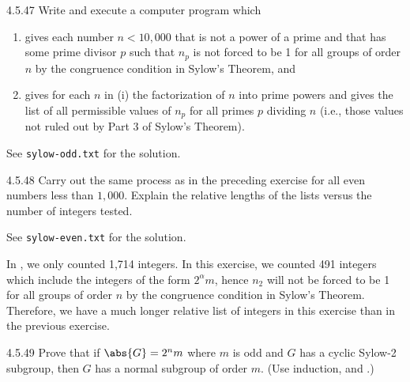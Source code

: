 \begin{exercise}{4.5.47}
	Write and execute a computer program which
	\begin{enumerate}
		\item[(i)] gives each number $n < 10,000$ that is not a power of a prime and that has some prime divisor $p$ such that $n_p$ is not forced to be 1 for all groups of order $n$ by the congruence condition in Sylow's Theorem, and
		\item[(ii)] gives for each $n$ in (i) the factorization of $n$ into prime powers and gives the list of all permissible values of $n_p$ for all primes $p$ dividing $n$ (i.e., those values not ruled out by Part 3 of Sylow's Theorem).
	\end{enumerate}
\end{exercise}

\begin{sol}
	See \verb|sylow-odd.txt| for the solution.
\end{sol}

\begin{exercise}{4.5.48}
	Carry out the same process as in the preceding exercise for all even numbers less than $1,000$.
	Explain the relative lengths of the lists versus the number of integers tested.
\end{exercise}

\begin{sol}
	See \verb|sylow-even.txt| for the solution.

	In , we only counted 1,714 integers.
	In this exercise, we counted 491 integers which include the integers of the form $2^\alpha m$, hence $n_2$ will not be forced to be 1 for all groups of order $n$ by the congruence condition in Sylow's Theorem.
	Therefore, we have a much longer relative list of integers in this exercise than in the previous exercise.
\end{sol}

\begin{exercise}{4.5.49}
	Prove that if $\abs{G} = 2^nm$ where $m$ is odd and $G$ has a cyclic Sylow-2 subgroup, then $G$ has a normal subgroup of order $m$. (Use induction,  and .)
\end{exercise}

